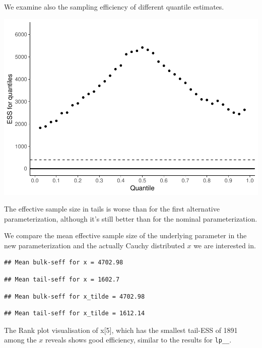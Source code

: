 \documentclass[american,]{article}
\begin{document}
We examine also the sampling efficiency of different quantile estimates.

\includegraphics{graphics/quantile-ess-fit-alt3-1.pdf}

The effective sample size in tails is worse than for the first
alternative parameterization, although it's still better than for the
nominal parameterization.

We compare the mean effective sample size of the underlying parameter in
the new parameterization and the actually Cauchy distributed \(x\) we
are interested in.

\begin{verbatim}
## Mean bulk-seff for x = 4702.98
\end{verbatim}

\begin{verbatim}
## Mean tail-seff for x = 1602.7
\end{verbatim}

\begin{verbatim}
## Mean bulk-seff for x_tilde = 4702.98
\end{verbatim}

\begin{verbatim}
## Mean tail-seff for x_tilde = 1612.14
\end{verbatim}

The Rank plot visualisation of x{[}5{]}, which has the smallest tail-ESS
of 1891 among the \(x\) reveals shows good efficiency, similar to the
results for \texttt{lp\_\_}.
\end{document}
